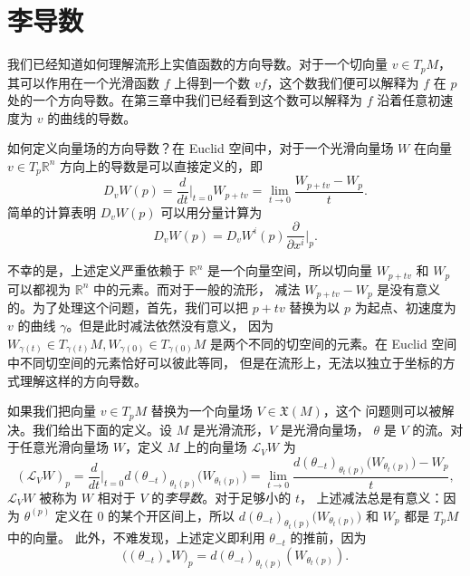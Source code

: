 \section{李导数}

我们已经知道如何理解流形上实值函数的方向导数。对于一个切向量 $v\in T_pM$，
其可以作用在一个光滑函数 $f$ 上得到一个数 $vf$，这个数我们便可以解释为 $f$
在 $p$ 处的一个方向导数。在第三章中我们已经看到这个数可以解释为 $f$
沿着任意初速度为 $v$ 的曲线的导数。

如何定义向量场的方向导数？在 Euclid 空间中，对于一个光滑向量场 $W$
在向量 $v\in T_p \mathbb{R}^n$ 方向上的导数是可以直接定义的，即
\[
  D_vW(p)=\frac{d}{dt}\bigg|_{t=0}W_{p+tv}=
  \lim_{t\to 0}\frac{W_{p+tv}-W_p}{t}.
\]
简单的计算表明 $D_vW(p)$ 可以用分量计算为
\[
  D_vW(p)=D_vW^i(p)\frac{\partial}{\partial x^i}\bigg|_p.
\]

不幸的是，上述定义严重依赖于 $\mathbb{R}^n$ 是一个向量空间，所以切向量
$W_{p+tv}$ 和 $W_p$ 可以都视为 $\mathbb{R}^n$ 中的元素。而对于一般的流形，
减法 $W_{p+tv}-W_p$ 是没有意义的。为了处理这个问题，首先，我们可以把 $p+tv$
替换为以 $p$ 为起点、初速度为 $v$ 的曲线 $\gamma$。但是此时减法依然没有意义，
因为 $W_{\gamma(t)}\in T_{\gamma(t)}M, W_{\gamma(0)}\in T_{\gamma(0)}M$
是两个不同的切空间的元素。在 Euclid 空间中不同切空间的元素恰好可以彼此等同，
但是在流形上，无法以独立于坐标的方式理解这样的方向导数。

如果我们把向量 $v\in T_pM$ 替换为一个向量场 $V\in \mathfrak X(M)$，这个
问题则可以被解决。我们给出下面的定义。设 $M$ 是光滑流形，$V$ 是光滑向量场，
$\theta$ 是 $V$ 的流。对于任意光滑向量场 $W$，定义 $M$ 上的向量场 $\mathcal L_VW$
为
\[
  (\mathcal L_VW)_p=\frac{d}{dt}\bigg|_{t=0}d(\theta_{-t})_{\theta_t(p)}\bigl(W_{\theta_t(p)}\bigr)
  =\lim_{t\to 0}\frac{d(\theta_{-t})_{\theta_t(p)}\bigl(W_{\theta_t(p)}\bigr)-W_p}{t},
\]
$\mathcal L_VW$ 被称为 $W$ 相对于 $V$ 的\emph{李导数}。对于足够小的 $t$，
上述减法总是有意义：因为 $\theta^{(p)}$ 定义在 $0$ 的某个开区间上，所以 
$d(\theta_{-t})_{\theta_t(p)}\bigl(W_{\theta_t(p)}\bigr)$ 和 $W_p$ 都是 $T_pM$ 中的向量。
此外，不难发现，上述定义即利用 $\theta_{-t}$ 的推前，因为
\[
\bigl((\theta_{-t})_*W\bigr)_p=d(\theta_{-t})_{\theta_t(p)}(W_{\theta_t(p)}).
\]

